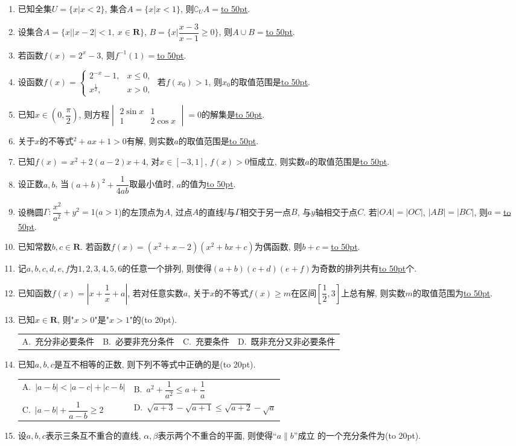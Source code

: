 \documentclass[10pt,a4paper]{article}
\newcommand{\blank}[1]{\underline{\hbox to #1pt{}}}
\newcommand{\bracket}[1]{(\hbox to #1pt{})}
\newcommand{\twoch}[4]{\par\begin{tabular}{p{.46\textwidth}p{.46\textwidth}}
A.~#1& B.~#2\\
C.~#3& D.~#4
\end{tabular}}
\newcommand{\fourch}[4]{\par\begin{tabular}{p{.23\textwidth}p{.23\textwidth}p{.23\textwidth}p{.23\textwidth}}
A.~#1 &B.~#2& C.~#3& D.~#4
\end{tabular}}
\begin{document}
\begin{enumerate}[1.]



\item 已知全集$U=\{x|x<2\}$, 集合$A=\{x|x<1\}$, 则$\complement_UA=$\blank{50}.
\item 设集合$A=\{x||x-2|<1, \ x\in\mathbf{R}\}$, $B=\{x|\dfrac{x-3}{x-1}\ge 0\}$, 则$A\cup B=$\blank{50}.
\item 若函数$f(x)=2^x-3$, 则$f^{-1}(1)=$\blank{50}.
\item 设函数$f(x)=\begin{cases} 2^{-x}-1,  & x\le 0,\\ x^\frac 12, & x>0,\end{cases}$ 若$f(x_0)>1$, 则$x_0$的取值范围是\blank{50}.
\item 已知$x\in (0,\dfrac{\pi}2)$, 则方程$\begin{vmatrix} 2\sin x   & 1  \\1  & 2\cos x  \end{vmatrix}=0$的解集是\blank{50}.
\item 关于$x$的不等式$^2+ax+1>0$有解, 则实数$a$的取值范围是\blank{50}.
\item 已知$f(x)=x^2+2(a-2)x+4$, 对$x\in[-3, 1]$, $f(x)>0$恒成立, 则实数$a$的取值范围是\blank{50}.
\item 设正数$a,b$, 当$(a+b)^2+\dfrac{1}{4ab}$取最小值时, $a$的值为\blank{50}.
\item 设椭圆$\Gamma:\dfrac{x^2}{a^2}+{y^2}=1$($a>1$)的左顶点为$A$, 过点$A$的直线$l$与$\Gamma$相交于另一点$B$, 与$y$轴相交于点$C$. 若$|OA|=|OC|$, $|AB|=|BC|$, 则$a=$\blank{50}.
\item 已知常数$b,c\in \mathbf{R}$. 若函数$f(x)=(x^2+x-2)(x^2+bx+c)$为偶函数, 则$b+c=$\blank{50}.
\item 记$a,b,c,d,e,f$为$1,2,3,4,5,6$的任意一个排列, 则使得$(a+b)(c+d)(e+f)$为奇数的排列共有\blank{50}个.
\item 已知函数$f(x)=|x+\dfrac 1x+a|$, 若对任意实数$a$, 关于$x$的不等式$f(x)\ge m$在区间$[\dfrac 12,3]$上总有解, 则实数$m$的取值范围为\blank{50}.
\item 已知$x\in\mathbf{R}$, 则"$x>0$"是"$x>1$"的\bracket{20}.
\fourch{充分非必要条件}{必要非充分条件}{充要条件}{既非充分又非必要条件}
\item 已知$a,b,c$是互不相等的正数, 则下列不等式中正确的是\bracket{20}.
\twoch{$|a-b|<|a-c|+|c-b|$}{$a^2+\dfrac{1}{a^2}\le a+\dfrac{1}{a}$}{$|a-b|+\dfrac{1}{a-b}\ge 2$}{$\sqrt{a+3}-\sqrt{a+1}\le\sqrt{a+2}-\sqrt a$}
\item 设$a,b,c$表示三条互不重合的直线, $\alpha,\beta$表示两个不重合的平面, 则使得``$a\parallel b$''成立	的一个充分条件为\bracket{20}.

\end{enumerate}
\end{document}
